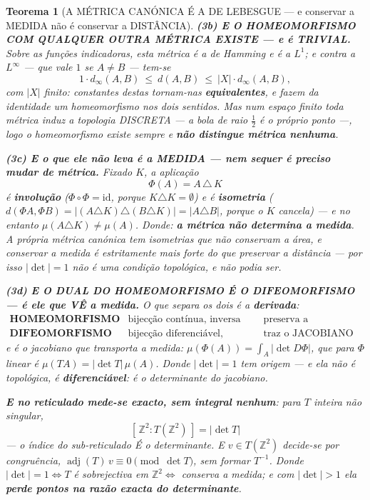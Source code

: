 \documentclass[11pt,a4paper]{article}
\newtheorem{teorema}{Teorema}
\newcommand{\abs}[1]{\lvert #1\rvert}
\begin{document}
\begin{teorema}[A MÉTRICA CANÓNICA É A DE LEBESGUE --- e conservar a MEDIDA não é
conservar a DISTÂNCIA]
\textbf{(3b) E O HOMEOMORFISMO COM QUALQUER OUTRA MÉTRICA EXISTE --- e é TRIVIAL.} Sobre
as funções indicadoras, esta métrica \emph{é} a de Hamming e \emph{é} a $L^{1}$; e contra a
$L^{\infty}$ --- que vale $1$ se $A\neq B$ --- tem-se
\[
1\cdot d_{\infty}(A,B)\ \leq\ d(A,B)\ \leq\ \abs{X}\cdot d_{\infty}(A,B),
\]
com $\abs{X}$ finito: constantes destas tornam-nas \textbf{equivalentes}, e fazem da
\emph{identidade} um homeomorfismo nos dois sentidos. \emph{Mas num espaço finito toda
métrica induz a topologia DISCRETA} --- a bola de raio $\tfrac12$ é o próprio ponto ---,
logo o homeomorfismo existe sempre e \textbf{não distingue métrica nenhuma}.

\textbf{(3c) E o que ele não leva é a MEDIDA --- nem sequer é preciso mudar de métrica.}
Fixado $K$, a aplicação
\[
\boxed{\;\Phi(A)=A\,\triangle\,K\;}
\]
é \textbf{involução} ($\Phi\circ\Phi=\mathrm{id}$, porque $K\triangle K=\emptyset$) e é
\textbf{isometria} ($d(\Phi A,\Phi B)=\abs{(A\triangle K)\triangle(B\triangle K)}
=\abs{A\triangle B}$, porque o $K$ cancela) --- \emph{e no entanto}
$\mu(A\triangle K)\neq\mu(A)$. Donde: \textbf{a métrica não determina a medida}. A própria
métrica canónica tem isometrias que não conservam a área, e \emph{conservar a medida é
estritamente mais forte do que preservar a distância} --- por isso $\abs{\det}=1$ não é uma
condição topológica, e não podia ser.

\textbf{(3d) E O DUAL DO HOMEOMORFISMO É O DIFEOMORFISMO --- é ele que VÊ a medida.} O
que separa os dois é a \textbf{derivada}:
\[
\begin{array}{lll}
\textbf{HOMEOMORFISMO} & \text{bijecção contínua, inversa contínua} &
\text{preserva a TOPOLOGIA}\\[2pt]
\textbf{DIFEOMORFISMO} & \text{bijecção diferenciável, inversa idem} &
\text{traz o JACOBIANO}
\end{array}
\]
e é o jacobiano que transporta a medida: $\mu(\Phi(A))=\int_A\abs{\det D\Phi}$, que para
$\Phi$ linear é $\mu(TA)=\abs{\det T}\,\mu(A)$. \emph{Donde $\abs{\det}=1$ tem origem} ---
e ela não é topológica, é \textbf{diferenciável}: é o determinante do jacobiano.

\textbf{E no reticulado mede-se exacto, sem integral nenhum}: para $T$ inteira não
singular,
\[
\boxed{\;[\,\mathbb{Z}^{2}:T(\mathbb{Z}^{2})\,]=\abs{\det T}\;}
\]
--- o \emph{índice} do sub-reticulado É o determinante. E $v\in T(\mathbb{Z}^{2})$
decide-se por congruência, $\operatorname{adj}(T)\,v\equiv0\pmod{\det T}$, sem formar
$T^{-1}$. Donde $\abs{\det}=1\iff T$ é sobrejectiva em $\mathbb{Z}^{2}\iff$ conserva a
medida; e com $\abs{\det}>1$ ela \textbf{perde pontos na razão exacta do determinante}.


\end{teorema}
\end{document}
